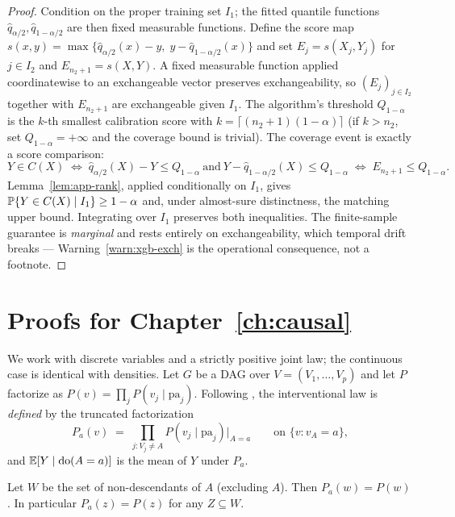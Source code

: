 \begin{proof}
Condition on the proper training set $I_1$; the fitted quantile functions $\hat q_{\alpha/2}, \hat
q_{1-\alpha/2}$ are then fixed measurable functions. Define the score map $s(x,y) = \max\{\hat
q_{\alpha/2}(x) - y,\; y - \hat q_{1-\alpha/2}(x)\}$ and set $E_j = s(X_j, Y_j)$ for $j \in I_2$ and
$E_{n_2+1} = s(X, Y)$. A fixed measurable function applied coordinatewise to an exchangeable vector
preserves exchangeability, so $(E_j)_{j \in I_2}$ together with $E_{n_2+1}$ are exchangeable given
$I_1$. The algorithm's threshold $Q_{1-\alpha}$ is the $k$-th smallest calibration score with $k =
\lceil (n_2+1)(1-\alpha) \rceil$ (if $k > n_2$, set $Q_{1-\alpha} = +\infty$ and the coverage bound
is trivial). The coverage event is exactly a score comparison:
\[
Y \in C(X)
\;\Longleftrightarrow\;
\hat q_{\alpha/2}(X) - Y \le Q_{1-\alpha} \ \text{and}\ Y - \hat q_{1-\alpha/2}(X) \le Q_{1-\alpha}
\;\Longleftrightarrow\;
E_{n_2+1} \le Q_{1-\alpha}.
\]
Lemma~\ref{lem:app-rank}, applied conditionally on $I_1$, gives $\mathbb{P}\{Y \in C(X) \mid I_1\} \ge
1-\alpha$ and, under almost-sure distinctness, the matching upper bound. Integrating over $I_1$
preserves both inequalities. The finite-sample guarantee is \emph{marginal} and rests entirely on
exchangeability, which temporal drift breaks --- Warning~\ref{warn:xgb-exch} is the operational
consequence, not a footnote.
\end{proof}

\section{Proofs for Chapter~\ref{ch:causal}}
\label{app:proofs-ch5}

We work with discrete variables and a strictly positive joint law; the continuous case is identical
with densities. Let $G$ be a DAG over $V = (V_1, \dots, V_p)$ and let $P$ factorize as $P(v) =
\prod_j P(v_j \mid \mathrm{pa}_j)$. Following \cite{pearl1995}, the interventional law is
\emph{defined} by the truncated factorization
\begin{equation}
\label{eq:app-trunc}
P_a(v) \;=\; \prod_{j : V_j \ne A} P(v_j \mid \mathrm{pa}_j) \Big|_{A = a}
\qquad \text{on } \{v : v_A = a\},
\end{equation}
and $\mathbb{E}[Y \mid \mathrm{do}(A=a)]$ is the mean of $Y$ under $P_a$.

\begin{lemma}
\label{lem:app-truncmarg}
Let $W$ be the set of non-descendants of $A$ (excluding $A$). Then $P_a(w) = P(w)$. In particular
$P_a(z) = P(z)$ for any $Z \subseteq W$.
\end{lemma}

